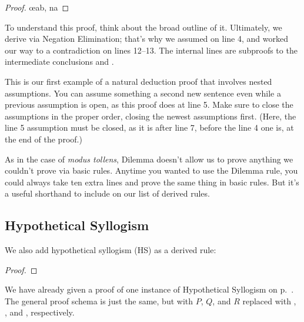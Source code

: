 \begin{proof}
	\open
		\open
			\metaA{}
		\close
		\open
			\metaB{}
		\close
		\metaB{}\oe{ab, na}
	\close
	 
\end{proof}

To understand this proof, think about the broad outline of it. Ultimately, we derive \metaC{} via Negation Elimination; that's why we assumed \enot\metaC{} on line 4, and worked our way to a contradiction on lines 12--13. The internal lines are subproofs to the intermediate conclusions \metaB{} and \enot\metaB{}. 

This is our first example of a natural deduction proof that involves nested assumptions. You can assume something a second new sentence even while a previous assumption is open, as this proof does at line 5. Make sure to close the assumptions in the proper order, closing the newest assumptions first. (Here, the line 5 assumption must be closed, as it is after line 7, before the line 4 one is, at the end of the proof.)

As in the case of \emph{modus tollens}, Dilemma doesn't allow us to prove anything we couldn't prove via basic rules. Anytime you wanted to use the Dilemma rule, you could always take ten extra lines and prove the same thing in basic rules. But it's a useful shorthand to include on our list of derived rules.

\subsection{Hypothetical Syllogism}



We also add hypothetical syllogism (HS) as a derived rule:

\begin{proof}
\end{proof}

We have already given a proof of one instance of Hypothetical Syllogism on p.~\pageref{HSproof}. The general proof schema is just the same, but with $P$, $Q$, and $R$ replaced with \metaA{}, \metaB{}, and \metaC{}, respectively.





